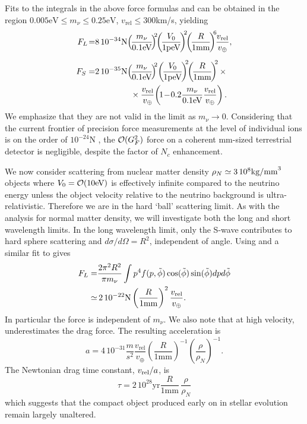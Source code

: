 Fits to the integrals in the above force formulas  and  can be obtained in the region $0.005 \text{eV}\leq m_\nu\leq 0.25\text{eV}$, $v_\text{rel}\leq 300$km/s, yielding
\begin{align}\label{F_L}
F_L\!=&8\,10^{-34}{\rm N}\!\left(\!\frac{m_\nu}{0.1 \text{eV}}\!\right)^{\!\!2}\!\! \left(\!\frac{V_0}{1\text{peV}}\!\right)^{\!\!2}\!\!\left(\!\frac{R}{1\text{mm}}\!\right)^{\!\! 6} \!\!\frac{v_{\text{rel}}}{v_\oplus},\\[0.2cm]
F_S=&2\, 10^{-35}{\rm N}\!\left(\!\frac{m_\nu}{0.1\text{eV}}\!\right)^{\!\!2}\! \left(\!\frac{V_0}{1\text{peV}}\!\right)^{\!\!2}\!\!\left(\!\frac{R}{1\text{mm}}\!\right)^{\!\!2}\times\notag \\
&\hspace*{1.5cm}\times\frac{v_{\text{rel}}}{v_\oplus}\!\left(\!1\!-\!0.2\frac{m_\nu}{0.1\text{eV}}\frac{v_{\text{rel}}}{v_\oplus}\right).
\end{align}
We emphasize that they are not valid in the limit as $m_\nu\rightarrow 0$. Considering that the current frontier of precision force measurements at the level of individual ions is on the order of $10^{-24}$N \cite{Biercuk}, the ${\cal O}(G_F^2)$ force on a coherent mm-sized terrestrial detector is negligible, despite the factor of $N_c$ enhancement. 

We now consider scattering from nuclear matter density $\rho_N\simeq 3 \, 10^{8}{\rm kg/mm}^3$ objects where $V_0={\cal O}(10\text{eV})$ is effectively infinite compared to the neutrino energy unless the object velocity relative to the neutrino background is ultra-relativistic.  Therefore we are in the hard `ball' scattering limit. As with the analysis for normal matter density, we will investigate both the long and short wavelength limits. In the long wavelength limit, only the S-wave contributes to hard sphere scattering and $d\sigma/d\Omega=R^2$, independent of angle. Using  and a similar fit to  gives
\begin{align}\label{FLHard}
F_L=&\frac{2\pi^2R^2}{\pi m_\nu} \int p^4 f(p,\tilde\phi) \cos(\tilde\phi) \sin(\tilde\phi) dpd\tilde\phi\\
\simeq &\, 2\, 10^{-22}{\rm N}\left(\frac{R}{1\text{mm}}\right)^2\frac{v_{\text{rel}}}{v_\oplus}.
\end{align}
In particular the force is independent of $m_\nu$.  We also note that at high velocity,   underestimates the drag force. The resulting acceleration is
\begin{equation}
a=4\, 10^{-31}\frac{m}{s^2}\frac{v_{\text{rel}} }{v_\oplus}\! \left(\frac{R}{1\text{mm}}\right)^{-1}\!\!\left(\frac{\rho}{\rho_N}\right)^{-1}.\!\!
\end{equation}
The Newtonian drag time constant, $v_{\rm rel}/a$, is
\begin{equation}
\tau= 2\,10^{28}\text{yr}\frac{R}{1\text{mm}}\,\frac{\rho}{\rho_N}\!
\end{equation}
which suggests that the compact object produced early on in stellar evolution remain largely unaltered.

